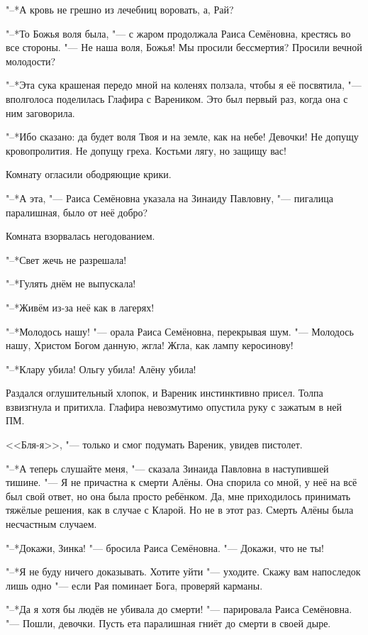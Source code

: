 "--*А кровь не грешно из лечебниц воровать, а, Рай?

"--*То Божья воля была, "--- с жаром продолжала Раиса Семёновна, крестясь во все стороны.
"--- Не наша воля, Божья!
Мы просили бессмертия?
Просили вечной молодости?

"--*Эта сука крашеная передо мной на коленях ползала, чтобы я её посвятила, "--- вполголоса поделилась Глафира с Вареником.
Это был первый раз, когда она с ним заговорила.

"--*Ибо сказано: да будет воля Твоя и на земле, как на небе!
Девочки!
Не допущу кровопролития.
Не допущу греха.
Костьми лягу, но защищу вас!

Комнату огласили ободряющие крики.

"--*А эта, "--- Раиса Семёновна указала на Зинаиду Павловну, "--- пигалица паралишная, было от неё добро?

Комната взорвалась негодованием.

"--*Свет жечь не разрешала!

"--*Гулять днём не выпускала!

"--*Живём из-за неё как в лагерях!

"--*Молодось нашу! "--- орала Раиса Семёновна, перекрывая шум.
"--- Молодось нашу, Христом Богом данную, жгла!
Жгла, как лампу керосинову!

"--*Клару убила!
Ольгу убила!
Алёну убила!

Раздался оглушительный хлопок, и Вареник инстинктивно присел.
Толпа взвизгнула и притихла.
Глафира невозмутимо опустила руку с зажатым в ней ПМ.

<<Бля-я>>, "--- только и смог подумать Вареник, увидев пистолет.

"--*А теперь слушайте меня, "--- сказала Зинаида Павловна в наступившей тишине.
"--- Я не причастна к смерти Алёны.
Она спорила со мной, у неё на всё был свой ответ, но она была просто ребёнком.
Да, мне приходилось принимать тяжёлые решения, как в случае с Кларой.
Но не в этот раз.
Смерть Алёны была несчастным случаем.

"--*Докажи, Зинка! "--- бросила Раиса Семёновна.
"--- Докажи, что не ты!

"--*Я не буду ничего доказывать.
Хотите уйти "--- уходите.
Скажу вам напоследок лишь одно "--- если Рая поминает Бога, проверяй карманы.

"--*Да я хотя бы людёв не убивала до смерти! "--- парировала Раиса Семёновна.
"--- Пошли, девочки.
Пусть ета паралишная гниёт до смерти в своей дыре.


